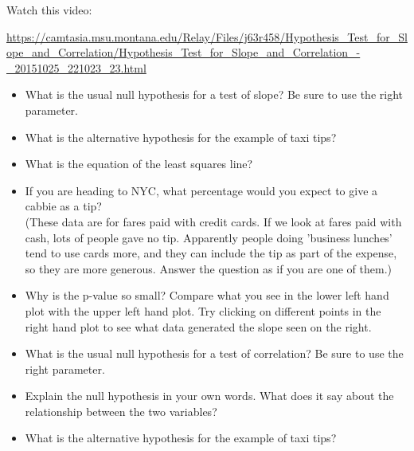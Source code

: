 \def\theTopic{Reading 16}

Watch this video:

\url{https://camtasia.msu.montana.edu/Relay/Files/j63r458/Hypothesis_Test_for_Slope_and_Correlation/Hypothesis_Test_for_Slope_and_Correlation_-_20151025_221023_23.html}
\large

\begin{itemize}
 \item What is the usual null hypothesis for a test of slope? Be sure
   to use the right parameter. \vspace{2cm}

 \item What is the alternative hypothesis for the example of taxi tips?\vspace{2cm}

 \item What is the equation of the least squares line?\vspace{2cm}

 \item If you are heading to NYC, what percentage would you expect to give a
   cabbie as a tip?\\
    (These data are for fares paid with credit cards. If we look at
    fares paid with cash, lots of people gave no tip. Apparently
    people doing 'business lunches' tend to use cards more, and they
    can include the tip as part of the expense, so they are more
    generous.  Answer the question as if you are one of them.) \vspace{2cm}

  \item Why is the p-value so small?  Compare what you see in the
    lower left hand plot with the upper left hand plot. Try clicking
    on different points in the right hand plot to see what data
    generated the slope seen on the right. \vspace{2cm}

  \item What is the usual null hypothesis for a test of correlation? Be sure
   to use the right parameter. \vspace{2cm}
  \item Explain the null hypothesis in your own words.  What does it
    say about the relationship between the two variables?\vspace{2cm}

  \item What is the alternative hypothesis for the example of taxi tips?\vspace{2cm}

\end{itemize}
\normalsize
